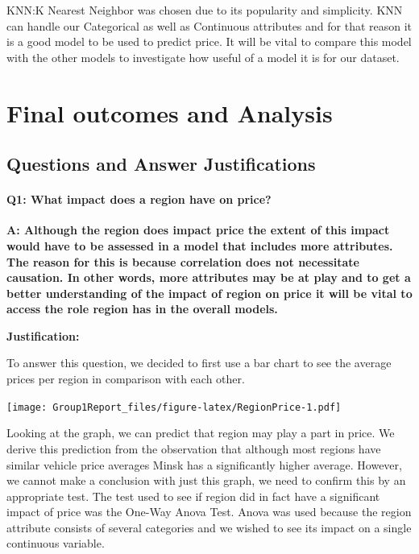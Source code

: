 \documentclass[
]{article}
\begin{document}
KNN:K Nearest Neighbor was chosen due to its popularity and simplicity.
KNN can handle our Categorical as well as Continuous attributes and for
that reason it is a good model to be used to predict price. It will be
vital to compare this model with the other models to investigate how
useful of a model it is for our dataset.

\hypertarget{final-outcomes-and-analysis}{%
\section{Final outcomes and
Analysis}\label{final-outcomes-and-analysis}}

\hypertarget{questions-and-answer-justifications}{%
\subsection{Questions and Answer
Justifications}\label{questions-and-answer-justifications}}

\hypertarget{q1-what-impact-does-a-region-have-on-price}{%
\paragraph{\texorpdfstring{\textbf{Q1:} What impact does a region have
on
price?}{Q1: What impact does a region have on price?}}\label{q1-what-impact-does-a-region-have-on-price}}

\textbf{A: Although the region does impact price the extent of this
impact would have to be assessed in a model that includes more
attributes. The reason for this is because correlation does not
necessitate causation. In other words, more attributes may be at play
and to get a better understanding of the impact of region on price it
will be vital to access the role region has in the overall models.}

\textbf{Justification:}

To answer this question, we decided to first use a bar chart to see the
average prices per region in comparison with each other.

\texttt{[image: Group1Report\_files/figure-latex/RegionPrice-1.pdf]}

Looking at the graph, we can predict that region may play a part in
price. We derive this prediction from the observation that although most
regions have similar vehicle price averages Minsk has a significantly
higher average. However, we cannot make a conclusion with just this
graph, we need to confirm this by an appropriate test. The test used to
see if region did in fact have a significant impact of price was the
One-Way Anova Test. Anova was used because the region attribute consists
of several categories and we wished to see its impact on a single
continuous variable.
\end{document}
